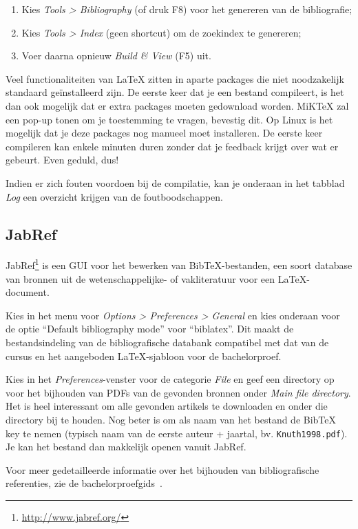 \begin{enumerate}
  \item Kies \emph{Tools > Bibliography} (of druk F8) voor het genereren van de bibliografie;
  \item Kies \emph{Tools > Index} (geen shortcut) om de zoekindex te genereren;
  \item Voer daarna opnieuw \emph{Build \& View} (F5) uit.
\end{enumerate}

Veel functionaliteiten van \LaTeX{} zitten in aparte packages die niet noodzakelijk standaard geïnstalleerd zijn. De eerste keer dat je een bestand compileert, is het dan ook mogelijk dat er extra packages moeten gedownload worden. MiK\TeX{} zal een pop-up tonen om je toestemming te vragen, bevestig dit. Op Linux is het mogelijk dat je deze packages nog manueel moet installeren. De eerste keer compileren kan enkele minuten duren zonder dat je feedback krijgt over wat er gebeurt. Even geduld, dus!

Indien er zich fouten voordoen bij de compilatie, kan je onderaan in het tabblad \emph{Log} een overzicht krijgen van de foutboodschappen.

\subsection{JabRef}

JabRef\footnote{\url{http://www.jabref.org/}} is een GUI voor het bewerken van Bib\TeX{}-bestanden, een soort database van bronnen uit de wetenschappelijke- of vakliteratuur voor een \LaTeX{}-document.

Kies in het menu voor \emph{Options > Preferences > General} en kies onderaan voor de optie ``Default bibliography mode'' voor ``biblatex''. Dit maakt de bestandsindeling van de bibliografische databank compatibel met dat van de cursus en het aangeboden \LaTeX{}-sjabloon voor de bachelorproef.

Kies in het \emph{Preferences}-venster voor de categorie \emph{File} en geef een directory op voor het bijhouden van PDFs van de gevonden bronnen onder \emph{Main file directory}. Het is heel interessant om alle gevonden artikels te downloaden en onder die directory bij te houden. Nog beter is om als naam van het bestand de Bib\TeX{} key te nemen (typisch naam van de eerste auteur + jaartal, bv. \texttt{Knuth1998.pdf}). Je kan het bestand dan makkelijk openen vanuit JabRef.

Voor meer gedetailleerde informatie over het bijhouden van bibliografische referenties, zie de bachelorproefgids~\autocite{VanVreckem2017}.

